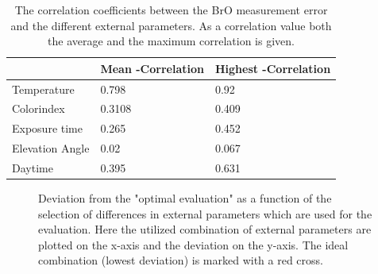 \documentclass  [
  paper    = a4,
  BCOR     = 10mm,
  twoside,
  fontsize = 12pt,
  fleqn,
  toc      = bibnumbered,
  toc      = listofnumbered,
  numbers  = noendperiod,
  headings = normal,
  listof   = leveldown,
  version  = 3.03
]                                       {scrreprt}
\begin{document}
	\begin{table}[h]
		\begin{tabular}{|p{4cm}|p{3cm}|p{3cm}|}
			&  Mean -Correlation&  Highest   -Correlation\\
			\toprule
			Temperature &0.798&	0.92\\
			\midrule
			Colorindex &0.3108&	0.409\\
			\midrule
			Exposure time &0.265&	0.452\\
			\midrule
			Elevation Angle &0.02&	0.067\\
			\midrule
			Daytime &0.395&	0.631\\
			\bottomrule
		\end{tabular}
	\label{tab:CorrEP}
	\caption{The correlation coefficients between the BrO measurement error and the different external parameters. As a correlation value both the average and the maximum correlation is given.}
	\end{table}
	\begin{figure}
		\caption{Deviation from the "optimal evaluation" as a function of the selection of differences in external parameters which are used for the evaluation. Here the utilized combination of external parameters are plotted on the x-axis and the deviation on the y-axis. The ideal combination (lowest deviation) is marked with a red cross.}
		\label{fig:WelcheEP}
	\end{figure}
\end{document}
